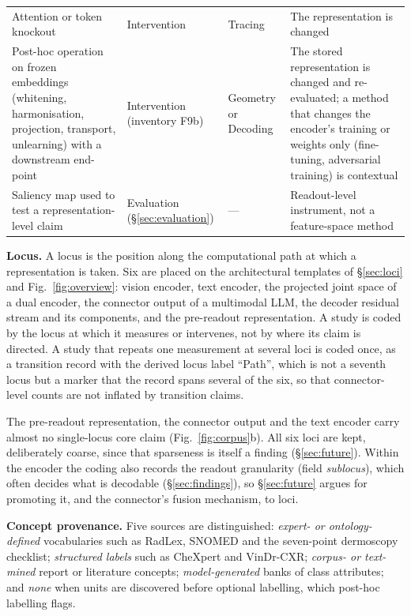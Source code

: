 \begin{table}[!tb]
\begin{tabular}{@{}L{5.4cm}L{2.8cm}L{1.9cm}L{5.2cm}@{}}
Attention or token knockout & Intervention & Tracing & The representation is changed \\
Post-hoc operation on frozen embeddings (whitening, harmonisation, projection, transport, unlearning) with a downstream end-point & Intervention (inventory F9b) & Geometry or Decoding & The stored representation is changed and re-evaluated; a method that changes the encoder's training or weights only (fine-tuning, adversarial training) is contextual \\
Saliency map used to test a representation-level claim & Evaluation (\S\ref{sec:evaluation}) & --- & Readout-level instrument, not a feature-space method \\
\bottomrule
\end{tabular}
\end{table}

\textbf{Locus.} A locus is the position along the computational path at which a representation is
taken. Six are placed on the architectural templates of \S\ref{sec:loci}
and Fig.~\ref{fig:overview}: vision encoder, text encoder, the projected joint space of a dual
encoder, the connector output of a multimodal LLM, the decoder residual stream and its components, and
the pre-readout representation. A study is coded by the locus at which it measures or intervenes, not
by where its claim is directed. A study that repeats one measurement at several loci is coded once, as a transition record with the derived locus label ``Path'', which is not a seventh locus but a marker that the record spans several of the six, so that connector-level counts are not inflated by transition claims.

The pre-readout representation, the connector output and the text encoder carry almost no single-locus core
claim (Fig.~\ref{fig:corpus}b). All six loci are kept, deliberately coarse, since that sparseness is itself a
finding (\S\ref{sec:future}). Within the encoder the coding also records the readout granularity (field
\emph{sublocus}), which often decides what is decodable (\S\ref{sec:findings}), so \S\ref{sec:future} argues
for promoting it, and the connector's fusion mechanism, to loci.

\textbf{Concept provenance.} Five sources are distinguished: \emph{expert- or ontology-defined}
vocabularies such as RadLex, SNOMED and the seven-point dermoscopy checklist; \emph{structured labels}
such as CheXpert and VinDr-CXR; \emph{corpus- or text-mined} report or literature concepts;
\emph{model-generated} banks of class attributes; and \emph{none} when units are discovered before
optional labelling, which post-hoc labelling flags.

